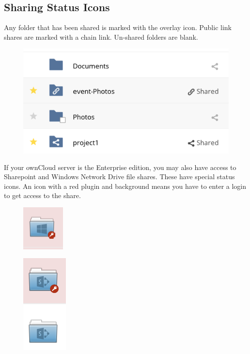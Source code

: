 \documentclass[letterpaper,10pt,english]{sphinxmanual}
\begin{document}
\subsection{Sharing Status Icons}
\label{files/access_webgui:sharing-status-icons}
Any folder that has been shared is marked with the  overlay icon.
Public link shares are marked with a chain link. Un-shared folders are blank.
\begin{figure}[htbp]
\centering

\includegraphics{files_page-5.png}
\end{figure}

If your ownCloud server is the Enterprise edition, you may also have access
to Sharepoint and Windows Network Drive file shares. These have special status
icons. An icon with a red plugin and background means you have to enter a login
to get access to the share.
\begin{figure}[htbp]
\centering

\includegraphics{users-overlays-win-net-drive.png}
\end{figure}
\begin{figure}[htbp]
\centering

\includegraphics{users-overlays-sharepoint.png}
\end{figure}
\end{document}
